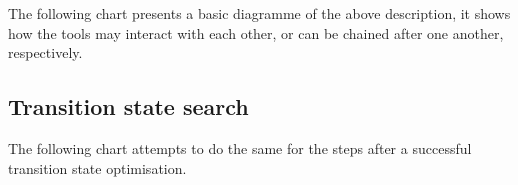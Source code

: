 \documentclass[   %
  final,          %
  a4paper         %
]{article}
\begin{document}
The following chart presents a basic diagramme of the above description,
it shows how the tools may interact with each other,
or can be chained after one another, respectively.


\subsection{Transition state search}

The following chart attempts to do the same for the steps after a successful 
transition state optimisation.

\end{document}
